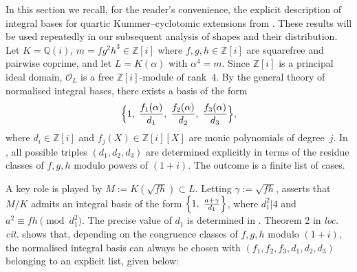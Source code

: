 \documentclass{amsart}
\newcommand{\Q}{\mathbb{Q}}
\newcommand{\Z}{\mathbb{Z}}
\newcommand{\cO}{\mathcal{O}}
\theoremstyle{plain}
\theoremstyle{definition}
\theoremstyle{remark}
\numberwithin{equation}{section}
\begin{document}
In this section we recall, for the reader’s convenience, the explicit
description of integral bases for quartic Kummer--cyclotomic extensions
from \cite{quartickummer}.  These results will be used repeatedly in our
subsequent analysis of shapes and their distribution. Let $K=\Q(i)$, $m=fg^{2}h^{3}\in\Z[i]$ where $f,g,h\in\Z[i]$ are squarefree and pairwise coprime, and let $L=K(\alpha)$ with $\alpha^{4}=m$. Since $\Z[i]$ is a principal ideal domain, $\cO_{L}$ is a free
$\Z[i]$-module of rank~$4$.  By the general theory of normalised
integral bases, there exists a basis of the form
\begin{equation}\label{eq:nib}
\Bigl\{
1,\;
\frac{f_{1}(\alpha)}{d_{1}},\;
\frac{f_{2}(\alpha)}{d_{2}},\;
\frac{f_{3}(\alpha)}{d_{3}}
\Bigr\},
\end{equation}
where $d_{i}\in\Z[i]$ and $f_{j}(X)\in\Z[i][X]$ are monic polynomials of
degree~$j$. In \cite{quartickummer}, all possible triples $(d_{1},d_{2},d_{3})$ are
determined explicitly in terms of the residue classes of $f,g,h$ modulo
powers of $(1+i)$.  The outcome is a finite list of cases.
\par A key role is played by $M:= K(\sqrt{fh}) \subset L$.
Letting $\gamma:=\sqrt{fh}$, \cite[Proposition 1]{quartickummer} asserts that 
$M/K$ admits an integral basis of the form $\Bigl\{1,\;\frac{a+\gamma}{d_{1}}\Bigr\}$,
where $d_{1}^2|4$ and $a^{2}\equiv fh \pmod{d_{1}^{2}}$. The precise value of $d_{1}$ is determined in \cite[Table 1]{quartickummer}. Theorem 2 in \emph{loc. cit.} shows that, depending on the
congruence classes of $f,g,h$ modulo $(1+i)$, the normalised
integral basis can always be chosen with $(f_1, f_2, f_3, d_1, d_2, d_3)$ belonging to an explicit
list, given below:
\end{document}
